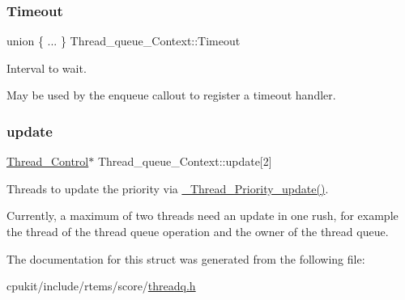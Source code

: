 \subsubsection{\texorpdfstring{Timeout}{Timeout}}
{\footnotesize\ttfamily union \{ ... \}   Thread\+\_\+queue\+\_\+\+Context\+::\+Timeout}



Interval to wait. 

May be used by the enqueue callout to register a timeout handler. \mbox{\label{structThread__queue__Context_ad78901023e5929c8581e74dbcf3d77b9}} 
\subsubsection{\texorpdfstring{update}{update}}
{\footnotesize\ttfamily \mbox{\hyperlink{struct__Thread__Control}{Thread\+\_\+\+Control}}$\ast$ Thread\+\_\+queue\+\_\+\+Context\+::update\mbox{[}2\mbox{]}}



Threads to update the priority via \mbox{\hyperlink{group__RTEMSScoreThread_ga424ec96c6cbed5a748565333d5fd7d59}{\+\_\+\+Thread\+\_\+\+Priority\+\_\+update()}}. 

Currently, a maximum of two threads need an update in one rush, for example the thread of the thread queue operation and the owner of the thread queue. 

The documentation for this struct was generated from the following file\+:\begin{DoxyCompactItemize}
\item 
cpukit/include/rtems/score/\mbox{\hyperlink{threadq_8h}{threadq.\+h}}\end{DoxyCompactItemize}
